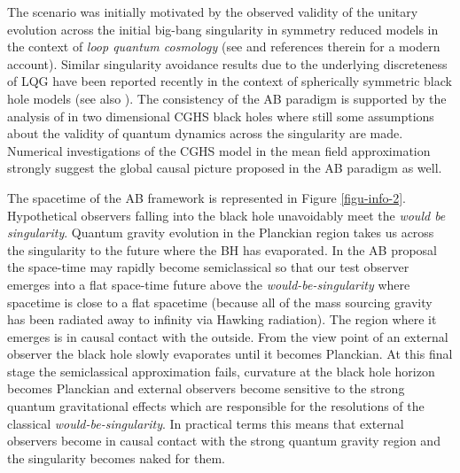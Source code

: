 \documentclass[aps, nofootinbib,superscriptaddress,12pt]{revtex4-2}
\begin{document}
The scenario was initially motivated by the observed validity of the unitary evolution across the initial big-bang singularity in symmetry reduced models in the context of {\em loop quantum cosmology} \cite{Bojowald:2001xe} (see \cite{Ashtekar:2011ni} and references therein for a modern account). Similar singularity avoidance results due to the underlying discreteness of LQG  have been reported  recently in the context of spherically symmetric black hole models \cite{Gambini:2014qga, Gambini:2014lya} (see also \cite{Saini:2016vgo}).   The consistency of the AB paradigm is supported by the analysis of \cite{Ashtekar:2008jd} in two dimensional CGHS black holes \cite{PhysRevD.45.R1005} where still some assumptions about the validity of quantum dynamics across the singularity are made.  Numerical investigations of the CGHS model in the mean field approximation \cite{Ashtekar:2010hx, Ashtekar:2010qz} strongly suggest the global causal picture proposed in the AB paradigm as well.

The spacetime of the AB framework is represented in Figure \ref{figu-info-2}. Hypothetical observers falling into the black hole unavoidably meet the {\em would be singularity}. Quantum gravity evolution in the Planckian region takes us across the singularity to the future where the BH has evaporated.  In the AB proposal the space-time may rapidly become semiclassical so that our test observer emerges into a flat space-time future above the {\em would-be-singularity} where spacetime is close to a flat spacetime (because all of the mass sourcing gravity has been radiated away to infinity via Hawking radiation).  The region where it emerges is in causal contact with the outside. From the view point of an external observer the black hole slowly evaporates until it becomes Planckian. At this final stage the semiclassical approximation fails, curvature at the black hole horizon becomes Planckian and  external observers become sensitive to the strong quantum gravitational effects which are responsible for the resolutions of the classical  {\em would-be-singularity}. In practical terms this means that external observers become in causal contact with the strong quantum gravity region and the singularity becomes naked for them.
\end{document}
